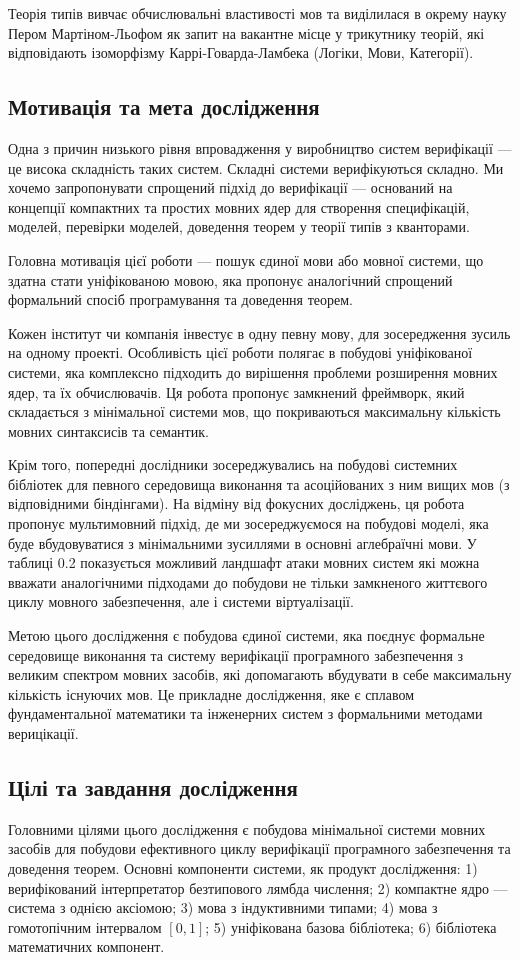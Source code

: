 Теорія типів вивчає обчислювальні властивості мов та виділилася
в окрему науку Пером Мартіном-Льофом як запит на вакантне місце у
трикутнику теорій, які відповідають ізоморфізму
Каррі-Говарда-Ламбека (Логіки, Мови, Категорії).

\subsection{Мотивація та мета дослідження}
Одна з причин низького рівня впровадження у виробництво систем
верифікації --- це висока складність таких систем. Складні системи
верифікуються складно. Ми хочемо запропонувати спрощений
підхід до верифікації --- оснований на концепції компактних
та простих мовних ядер для створення специфікацій, моделей,
перевірки моделей, доведення теорем у теорії типів з кванторами.

Головна мотивація цієї роботи --- пошук єдиної мови або мовної системи,
що здатна стати уніфікованою мовою, яка пропонує аналогічний спрощений
формальний спосіб програмування та доведення теорем.

Кожен інститут чи компанія інвестує в одну певну мову, для зосередження зусиль на одному проекті.
Особливість цієї роботи полягає в побудові уніфікованої системи, яка комплексно підходить
до вирішення проблеми розширення мовних ядер, та їх обчислювачів. Ця робота
пропонує замкнений фреймворк, який складається з мінімальної системи мов,
що покриваються максимальну кількість мовних синтаксисів та семантик.

Крім того, попередні дослідники зосереджувались на побудові системних бібліотек для
певного середовища виконання та асоційованих з ним вищих мов (з відповідними біндінгами).
На відміну від фокусних досліджень, ця робота пропонує мультимовний підхід,
де ми зосереджуємося на побудові моделі, яка буде вбудовуватися з мінімальними
зусиллями в основні аглебраїчні мови. У таблиці 0.2 показується можливий ландшафт атаки
мовних систем які можна вважати аналогічними підходами до побудови не тільки замкненого
життєвого циклу мовного забезпечення, але і системи віртуалізації.

Метою цього дослідження є побудова єдиної системи, яка поєднує формальне середовище
виконання та систему верифікації програмного забезпечення з великим спектром мовних
засобів, які допомагають вбудувати в себе максимальну кількість існуючих мов.
Це прикладне дослідження, яке є сплавом фундаментальної математики та інженерних
систем з формальними методами верицікації.

\subsection{Цілі та завдання дослідження}
Головними цілями цього дослідження є побудова мінімальної системи
мовних засобів для побудови ефективного циклу верифікації програмного
забезпечення та доведення теорем. Основні компоненти системи, як продукт дослідження:
1) верифікований інтерпретатор безтипового лямбда числення;
2) компактне ядро --- система з однією аксіомою;
3) мова з індуктивними типами;
4) мова з гомотопічним інтервалом $[0,1]$;
5) уніфікована базова бібліотека;
6) бібліотека математичних компонент.

